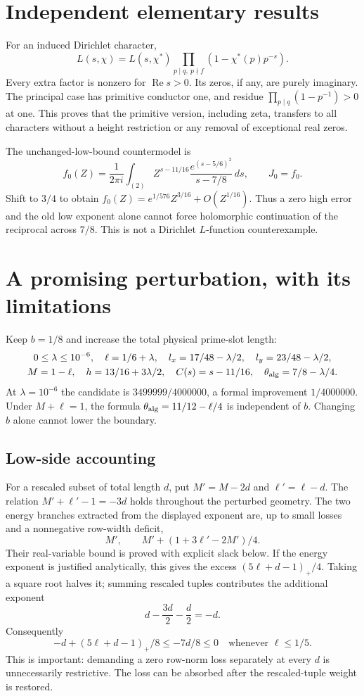 \documentclass[12pt]{article}
\newcommand{\Rea}{\operatorname{Re}}
\begin{document}
\section{Independent elementary results}
For an induced Dirichlet character,
\[
 L(s,\chi)=L(s,\chi^\ast)
 \prod_{p\mid q,\ p\nmid f}(1-\chi^\ast(p)p^{-s}).
\]
Every extra factor is nonzero for \(\Rea s>0\).  Its zeros, if any,
are purely imaginary.  The principal case has primitive conductor one,
and residue \(\prod_{p\mid q}(1-p^{-1})>0\) at one.
This proves that the primitive version, including zeta, transfers to
all characters without a height restriction or any removal of
exceptional real zeros.

The unchanged-low-bound countermodel is
\[
 f_0(Z)=\frac1{2\pi i}\int_{(2)}
   Z^{s-11/16}\frac{e^{(s-5/6)^2}}{s-7/8}\,ds,\qquad J_0=f_0 .
\]
Shift to \(3/4\) to obtain
\(f_0(Z)=e^{1/576}Z^{3/16}+O(Z^{1/16})\).
Thus a zero high error and the old low exponent alone cannot force
holomorphic continuation of the reciprocal across \(7/8\).
This is not a Dirichlet \(L\)-function counterexample.

\section{A promising perturbation, with its limitations}
Keep \(b=1/8\) and increase the total physical prime-slot length:
\[
\begin{gathered}
 0\leq\lambda\leq10^{-6},\quad \ell=1/6+\lambda,\quad
 l_x=17/48-\lambda/2,\quad l_y=23/48-\lambda/2,\\
 M=1-\ell,\quad h=13/16+3\lambda/2,\quad
 C(s)=s-11/16,\quad \theta_{\rm alg}=7/8-\lambda/4.
\end{gathered}
\]
At \(\lambda=10^{-6}\) the candidate is \(3499999/4000000\),
a formal improvement \(1/4000000\).
Under \(M+\ell=1\), the formula
\(\theta_{\rm alg}=11/12-\ell/4\) is independent of \(b\).
Changing \(b\) alone cannot lower the boundary.

\subsection{Low-side accounting}
For a rescaled subset of total length \(d\), put
\(M'=M-2d\) and \(\ell'=\ell-d\).
The relation \(M'+\ell'-1=-3d\) holds throughout the perturbed geometry.
The two energy branches extracted from the displayed exponent are,
up to small losses and a nonnegative row-width deficit,
\[
 M',\qquad M'+(1+3\ell'-2M')/4.
\]
Their real-variable bound is proved with explicit slack below.
If the energy exponent is justified analytically, this gives the excess
\((5\ell+d-1)_+/4\).
Taking a square root halves it; summing rescaled tuples contributes
the additional exponent
\[
 d-\frac{3d}{2}-\frac d2=-d.
\]
Consequently
\[
 -d+(5\ell+d-1)_+/8\leq -7d/8\leq0
 \quad\text{whenever }\ell\leq1/5.
\]
This is important: demanding a zero row-norm loss separately at every
\(d\) is unnecessarily restrictive.  The loss can be absorbed after
the rescaled-tuple weight is restored.
\end{document}
